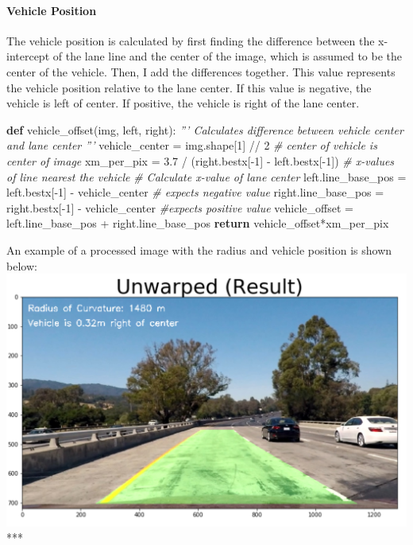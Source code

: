 \documentclass[11pt]{article}
\makeatletter
\def\maxwidth{\ifdim\Gin@nat@width>\linewidth\linewidth
    \else\Gin@nat@width\fi}
\let\Oldincludegraphics\includegraphics
\renewcommand{\includegraphics}[1]{\Oldincludegraphics[width=.8\maxwidth]{#1}}
\newenvironment{Shaded}{}{}
\newcommand{\KeywordTok}[1]{\textcolor[rgb]{0.00,0.44,0.13}{\textbf{{#1}}}}
\newcommand{\DecValTok}[1]{\textcolor[rgb]{0.25,0.63,0.44}{{#1}}}
\newcommand{\FloatTok}[1]{\textcolor[rgb]{0.25,0.63,0.44}{{#1}}}
\newcommand{\CommentTok}[1]{\textcolor[rgb]{0.38,0.63,0.69}{\textit{{#1}}}}
\newcommand{\NormalTok}[1]{{#1}}
\newcommand{\ControlFlowTok}[1]{\textcolor[rgb]{0.00,0.44,0.13}{\textbf{{#1}}}}
\newcommand{\OperatorTok}[1]{\textcolor[rgb]{0.40,0.40,0.40}{{#1}}}
\makeatother
\begin{document}
\hypertarget{vehicle-position}{%
\paragraph{Vehicle Position}\label{vehicle-position}}

The vehicle position is calculated by first finding the difference
between the x-intercept of the lane line and the center of the image,
which is assumed to be the center of the vehicle. Then, I add the
differences together. This value represents the vehicle position
relative to the lane center. If this value is negative, the vehicle is
left of center. If positive, the vehicle is right of the lane center.

\begin{Shaded}
\begin{Highlighting}[]
\KeywordTok{def}\NormalTok{ vehicle_offset(img, left, right):}
    \CommentTok{''' Calculates difference between vehicle center and lane center '''}
\NormalTok{    vehicle_center }\OperatorTok{=}\NormalTok{ img.shape[}\DecValTok{1}\NormalTok{] }\OperatorTok{//} \DecValTok{2}  \CommentTok{# center of vehicle is center of image}
\NormalTok{    xm_per_pix }\OperatorTok{=} \FloatTok{3.7} \OperatorTok{/}\NormalTok{ (right.bestx[}\OperatorTok{-}\DecValTok{1}\NormalTok{] }\OperatorTok{-}\NormalTok{ left.bestx[}\OperatorTok{-}\DecValTok{1}\NormalTok{])  }\CommentTok{# x-values of line nearest the vehicle}
    \CommentTok{# Calculate x-value of lane center}
\NormalTok{    left.line_base_pos }\OperatorTok{=}\NormalTok{ left.bestx[}\OperatorTok{-}\DecValTok{1}\NormalTok{] }\OperatorTok{-}\NormalTok{ vehicle_center    }\CommentTok{# expects negative value}
\NormalTok{    right.line_base_pos }\OperatorTok{=}\NormalTok{ right.bestx[}\OperatorTok{-}\DecValTok{1}\NormalTok{] }\OperatorTok{-}\NormalTok{ vehicle_center  }\CommentTok{#expects positive value}
\NormalTok{    vehicle_offset }\OperatorTok{=}\NormalTok{ left.line_base_pos }\OperatorTok{+}\NormalTok{ right.line_base_pos}
    \ControlFlowTok{return}\NormalTok{ vehicle_offset}\OperatorTok{*}\NormalTok{xm_per_pix}
\end{Highlighting}
\end{Shaded}

An example of a processed image with the radius and vehicle position is
shown below:
\includegraphics{./output_images/writeup_images/test1_rad.png} ***
\end{document}
